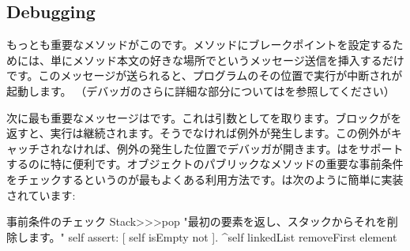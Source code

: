 \documentclass[a4paper,10pt,twoside]{book}
\begin{document}

\subsection{Debugging}

もっとも重要なメソッドがこのです。メソッドにブレークポイントを設定するためには、単にメソッド本文の好きな場所でというメッセージ送信を挿入するだけです。このメッセージが送られると、プログラムのその位置で実行が中断されが起動します。
（デバッガのさらに詳細な部分についてはを参照してください）


次に最も重要なメッセージはです。これは引数としてを取ります。ブロックがを返すと、実行は継続されます。そうでなければ例外が発生します。この例外がキャッチされなければ、例外の発生した位置でデバッガが開きます。はをサポートするのに特に便利です。オブジェクトのパブリックなメソッドの重要な事前条件をチェックするというのが最もよくある利用方法です。は次のように簡単に実装されています:

\begin{method}{事前条件のチェック}
Stack>>>pop
    "最初の要素を返し、スタックからそれを削除します。"
    self assert: [ self isEmpty not ].
    ^self linkedList removeFirst element
\end{method}
\end{document}
